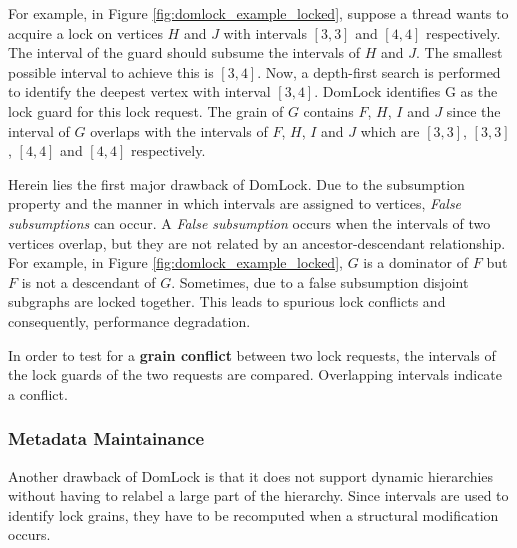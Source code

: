 

For example, in Figure \ref{fig:domlock_example_locked}, suppose a thread wants to acquire a lock on vertices $H$ and $J$ with intervals $[3,3]$ and $[4,4]$ respectively. The interval of the guard should subsume the intervals of $H$ and $J$. The smallest possible interval to achieve this is $[3,4]$. Now, a depth-first search is performed to identify the deepest vertex with interval $[3,4]$. DomLock identifies G as the lock guard for this lock request. The grain of $G$ contains $F$, $H$, $I$ and $J$ since the interval of $G$ overlaps with the intervals of $F$, $H$, $I$ and $J$ which are $[3,3]$, $[3,3]$, $[4,4]$ and $[4,4]$ respectively.

Herein lies the first major drawback of DomLock. 
Due to the subsumption property and the manner in which intervals are assigned to vertices, \emph{False subsumptions} can occur. 
A \emph{False subsumption} occurs when the intervals of two vertices overlap, but they are not related by an ancestor-descendant relationship. 
For example, in Figure \ref{fig:domlock_example_locked}, $G$ is a dominator of $F$ but $F$ is not a descendant of $G$. 
Sometimes, due to a false subsumption disjoint subgraphs are locked together. 
This leads to spurious lock conflicts and consequently, performance degradation. 

In order to test for a \textbf{grain conflict} between two lock requests, the intervals of the lock guards of the two requests are compared. Overlapping intervals indicate a conflict. 

\subsubsection{Metadata Maintainance}

Another drawback of DomLock is that it does not support dynamic hierarchies without having to relabel a large part of the hierarchy.
Since intervals are used to identify lock grains, they have to be recomputed when a structural modification occurs.


